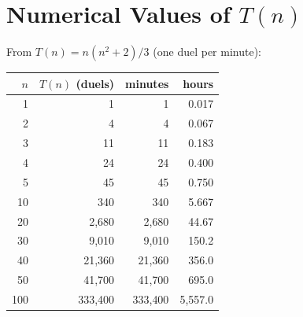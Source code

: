 \documentclass[11pt]{article}
\theoremstyle{definition}
\theoremstyle{remark}
\begin{document}
\appendix
\section{Numerical Values of $T(n)$}\label{app:tn}
From $T(n) = n(n^2 + 2)/3$ (one duel per minute):
\begin{center}
\begin{tabular}{rrrr}
\toprule
$n$ & $T(n)$ (duels) & minutes & hours\\
\midrule
1 & 1 & 1 & 0.017\\
2 & 4 & 4 & 0.067\\
3 & 11 & 11 & 0.183\\
4 & 24 & 24 & 0.400\\
5 & 45 & 45 & 0.750\\
10 & 340 & 340 & 5.667\\
20 & 2{,}680 & 2{,}680 & 44.67\\
30 & 9{,}010 & 9{,}010 & 150.2\\
40 & 21{,}360 & 21{,}360 & 356.0\\
50 & 41{,}700 & 41{,}700 & 695.0\\
100 & 333{,}400 & 333{,}400 & 5{,}557.0\\
\bottomrule
\end{tabular}
\end{center}
\end{document}
